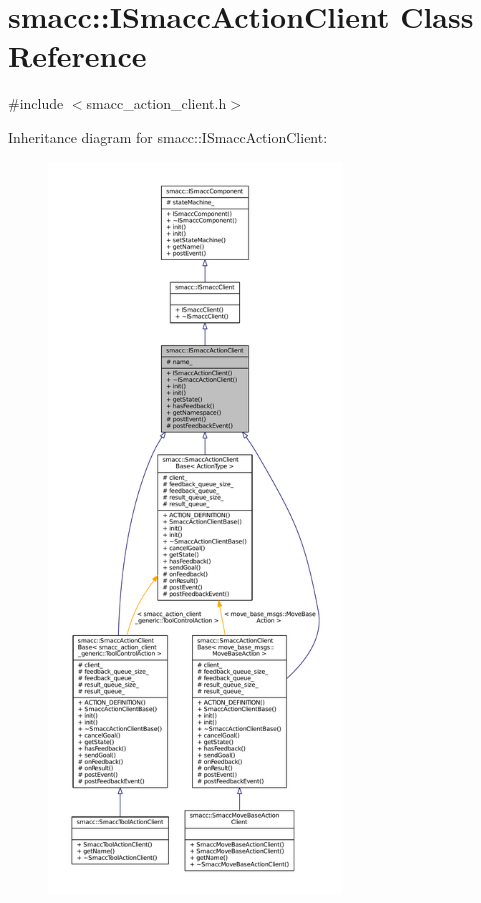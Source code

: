 \hypertarget{classsmacc_1_1ISmaccActionClient}{}\section{smacc\+:\+:I\+Smacc\+Action\+Client Class Reference}
\label{classsmacc_1_1ISmaccActionClient}


{\ttfamily \#include $<$smacc\+\_\+action\+\_\+client.\+h$>$}



Inheritance diagram for smacc\+:\+:I\+Smacc\+Action\+Client\+:
\nopagebreak
\begin{figure}[H]
\begin{center}
\leavevmode
\includegraphics[height=550pt]{classsmacc_1_1ISmaccActionClient__inherit__graph}
\end{center}
\end{figure}



